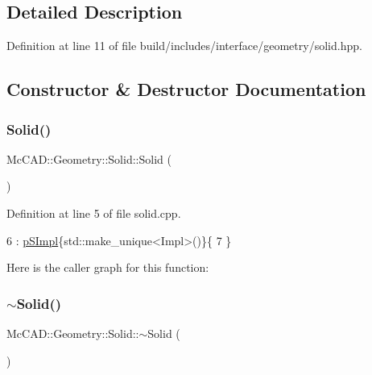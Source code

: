 \subsection{Detailed Description}


Definition at line 11 of file build/includes/interface/geometry/solid.\+hpp.



\subsection{Constructor \& Destructor Documentation}
\mbox{\label{classMcCAD_1_1Geometry_1_1Solid_ab54263b54174e2742c60e9c94e151819}} 
\subsubsection{\texorpdfstring{Solid()}{Solid()}\hspace{0.1cm}{\footnotesize\ttfamily [1/2]}}
{\footnotesize\ttfamily Mc\+C\+A\+D\+::\+Geometry\+::\+Solid\+::\+Solid (\begin{DoxyParamCaption}{ }\end{DoxyParamCaption})}



Definition at line 5 of file solid.\+cpp.


\begin{DoxyCode}
6     : \hyperlink{classMcCAD_1_1Geometry_1_1Solid_a77640dab3831396c6527ead13c953614}{pSImpl}\{std::make\_unique<Impl>()\}\{
7 \}
\end{DoxyCode}
Here is the caller graph for this function\+:
\mbox{\label{classMcCAD_1_1Geometry_1_1Solid_a89070bfa348d36f00377c80d1059cbfd}} 
\subsubsection{\texorpdfstring{$\sim$\+Solid()}{~Solid()}\hspace{0.1cm}{\footnotesize\ttfamily [1/2]}}
{\footnotesize\ttfamily Mc\+C\+A\+D\+::\+Geometry\+::\+Solid\+::$\sim$\+Solid (\begin{DoxyParamCaption}{ }\end{DoxyParamCaption})}



